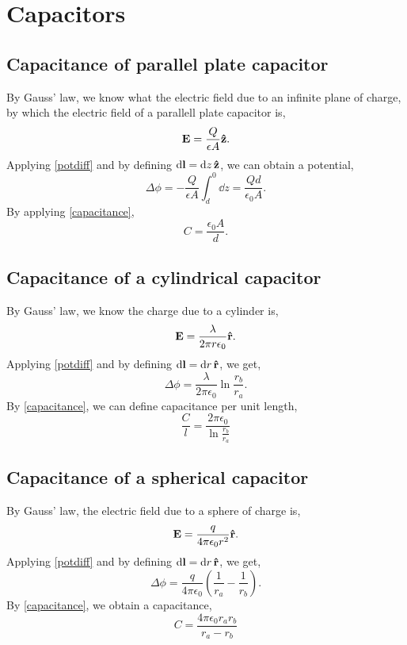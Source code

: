 \documentclass{book}
\begin{document}
\section{Capacitors}
\subsection{Capacitance of parallel plate capacitor}
By Gauss' law, we know what the electric field due to an infinite plane of charge, by which the electric field of a parallell plate capacitor is,
\begin{equation}
    \vb{E} = \frac{Q}{\epsilon A}\vu{z}.
\end{equation}
Applying \eqref{potdiff} and by defining $\dd{\vb{l}} = \dd{z}\vu{z}$, we can obtain a potential,
\begin{equation}
    \Delta \phi = -\frac{Q}{\epsilon A}\int_d^0\dd{z} = \frac{Qd}{\epsilon_0 A}.
\end{equation}
By applying \eqref{capacitance},
\begin{equation}
    C = \frac{\epsilon_0A}{d}.
\end{equation}
\subsection{Capacitance of a cylindrical capacitor}
By Gauss' law, we know the charge due to a cylinder is,
\begin{equation}
    \vb{E} = \frac{\lambda}{2\pi r \epsilon_0}\vu{r}.
\end{equation}
Applying \eqref{potdiff} and by defining $\dd{\vb{l}} = \dd{r}\vu{r}$, we get,
\begin{equation}
    \Delta \phi = \frac{\lambda}{2\pi\epsilon_0}\ln{\frac{r_b}{r_a}}.
\end{equation}
By \eqref{capacitance}, we can define capacitance per unit length,
\begin{equation}
    \frac{C}{l} = \frac{2\pi\epsilon_0}{\ln{\frac{r_b}{r_a}}}
\end{equation}
\subsection{Capacitance of a spherical capacitor}
By Gauss' law, the electric field due to a sphere of charge is,
\begin{equation}
    \vb{E} = \frac{q}{4\pi\epsilon_0r^2}\vu{r}.
\end{equation}
Applying \eqref{potdiff} and by defining $\dd{\vb{l}} = \dd{r}\vu{r}$, we get,
\begin{equation}
    \Delta \phi = \frac{q}{4\pi\epsilon_0}\left(\frac{1}{r_a} - \frac{1}{r_b}\right).
\end{equation}
By \eqref{capacitance}, we obtain a capacitance,
\begin{equation}
    C = \frac{4\pi\epsilon_0r_ar_b}{r_a - r_b}
\end{equation}
\end{document}
